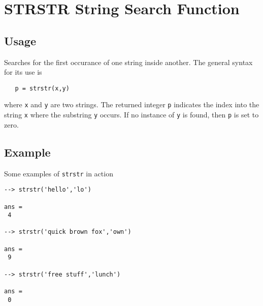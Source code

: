 \section{STRSTR String Search Function}

\subsection{Usage}

Searches for the first occurance of one string inside another.
The general syntax for its use is
\begin{verbatim}
   p = strstr(x,y)
\end{verbatim}
where \verb|x| and \verb|y| are two strings.  The returned integer \verb|p|
indicates the index into the string \verb|x| where the substring \verb|y|
occurs.  If no instance of \verb|y| is found, then \verb|p| is set to
zero.
\subsection{Example}

Some examples of \verb|strstr| in action
\begin{verbatim}
--> strstr('hello','lo')

ans = 
 4 

--> strstr('quick brown fox','own')

ans = 
 9 

--> strstr('free stuff','lunch')

ans = 
 0 
\end{verbatim}
